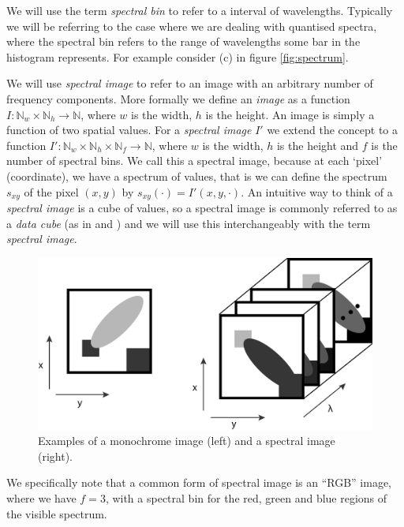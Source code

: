\documentclass[12pt,twoside,notitlepage]{report}
\newcommand{\bb}[1]{\mathbb{#1}}
\begin{document}
        We will use the term \textit{spectral bin} to refer to a interval of wavelengths. Typically we will be referring 
        to the case where we are dealing with quantised spectra, where the spectral bin refers to the range of 
        wavelengths some bar in the histogram represents. For example consider (c) in figure \ref{fig:spectrum}.

        We will use \textit{spectral image} to refer to an image with an arbitrary number of frequency components. More 
        formally we define an \textit{image} as a function $I : \bb{N}_w \times \bb{N}_h \rightarrow \bb{N}$, 
        where $w$ is the width, $h$ is the height. An image 
        is simply a function of two spatial values. For a \textit{spectral image} $I'$ we extend the concept to a 
        function $I' : \bb{N}_w \times \bb{N}_h \times \bb{N}_f \rightarrow \bb{N}$, where $w$ is the width, 
        $h$ is the height and $f$ is the number of spectral bins. We call this a spectral image, because at each `pixel' 
        (coordinate), we have a spectrum of values, that is we can define the spectrum $s_{xy}$ of the pixel $(x,y)$ by
        $s_{xy}(\cdot) = I'(x,y,\cdot)$. An intuitive way to think of a \textit{spectral image} is a cube of values, so 
        a spectral image is commonly referred to as a \textit{data cube} (as in \cite{Qingli:2013:spectralImagingTech} 
        and \cite{Bioucas-Dias:2012:unmixingOverview}) and we will use this interchangeably with the term 
        \textit{spectral image}.

        \begin{figure}[H]
            \centering
            \includegraphics[scale=0.25]{spectral_image}
            \caption{Examples of a monochrome image (left) and a spectral image (right).}
        \end{figure}

        We specifically note that a common form of spectral image is an ``RGB'' image, where we have $f=3$, with a 
        spectral bin for the red, green and blue regions of the visible spectrum.
\end{document}
